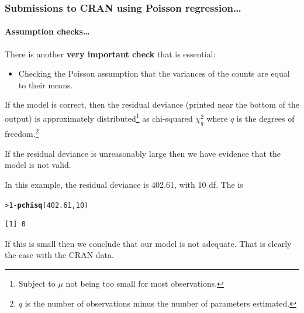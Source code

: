 \documentclass{beamer}\usepackage[]{graphicx}\usepackage[]{xcolor}
\makeatletter
\newcommand{\hlnum}[1]{\textcolor[rgb]{0.686,0.059,0.569}{#1}}%
\newcommand{\hlopt}[1]{\textcolor[rgb]{0,0,0}{#1}}%
\newcommand{\hlstd}[1]{\textcolor[rgb]{0.345,0.345,0.345}{#1}}%
\newcommand{\hlkwd}[1]{\textcolor[rgb]{0.737,0.353,0.396}{\textbf{#1}}}%
\newenvironment{kframe}{%
 \def\at@end@of@kframe{}%
 \ifinner\ifhmode%
  \def\at@end@of@kframe{\end{minipage}}%
  \begin{minipage}{\columnwidth}%
 \fi\fi%
 \def\FrameCommand##1{\hskip\@totalleftmargin \hskip-\fboxsep
 \colorbox{shadecolor}{##1}\hskip-\fboxsep
     \hskip-\linewidth \hskip-\@totalleftmargin \hskip\columnwidth}%
 \MakeFramed {\advance\hsize-\width
   \@totalleftmargin\z@ \linewidth\hsize
   \@setminipage}}%
 {\par\unskip\endMakeFramed%
 \at@end@of@kframe}
\newenvironment{knitrout}{}{} %
\makeatother
\begin{document}
\begin{frame}[fragile]
\frametitle{Submissions to CRAN using Poisson regression\ldots}
\framesubtitle{Assumption checks\ldots}

There is another {\bf very important check} that is essential:
\begin{itemize}
  \item Checking the Poisson assumption that the variances of the counts are equal to their means.
\end{itemize}
\medskip

If the model is correct, then the residual deviance (printed near the bottom of the  output) is approximately distributed\footnote{Subject to $\mu$ not being too small for most observations.} as chi-squared $\chi_q^2$ where $q$ is the degrees of freedom.\footnote{$q$ is the number of observations minus the number of parameters estimated.}
\medskip

If the residual deviance is unreasonably large then we have evidence that the model is not valid.
\medskip 

In this example, the residual deviance is 402.61, with 10 df. The \pval{} is

\begin{knitrout}\scriptsize
{}\color{fgcolor}\begin{kframe}
\begin{alltt}
\hlstd{> }\hlnum{1} \hlopt{-} \hlkwd{pchisq}\hlstd{(}\hlnum{402.61}\hlstd{,}\hlnum{10}\hlstd{)}
\end{alltt}
\begin{verbatim}
[1] 0
\end{verbatim}
\end{kframe}
\end{knitrout}

If this \pval{} is small then we conclude that our model is not adequate. That is clearly the case with the CRAN data.
\medskip

\end{frame}
\end{document}
